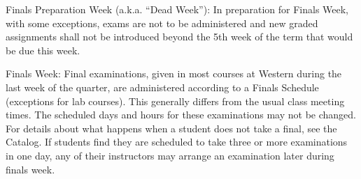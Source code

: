 \documentclass[letterpaper,12pt]{article}
\begin{document}
Finals Preparation Week (a.k.a. “Dead Week”): In preparation for Finals Week,
with some exceptions, exams are not to be administered and new graded
assignments shall not be introduced beyond the 5th week of the term that would
be due this week.

Finals Week: Final examinations, given in most courses at Western during the
last week of the quarter, are administered according to a Finals Schedule
(exceptions for lab courses). This generally differs from the usual class
meeting times. The scheduled days and hours for these examinations may not be
changed. For details about what happens when a student does not take a final,
see the Catalog. If students find they are scheduled to take three or more
examinations in one day, any of their instructors may arrange an examination
later during finals week.
\end{document}

